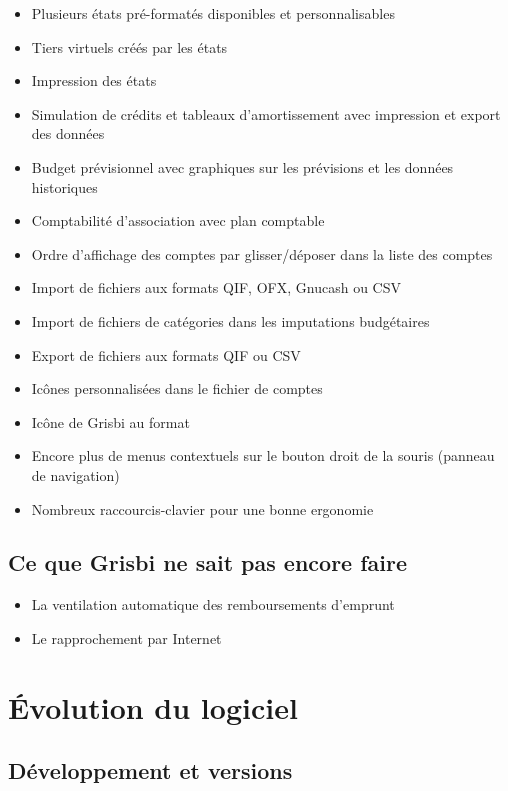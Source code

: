 \begin{itemize}
	\item Plusieurs états pré-formatés disponibles et personnalisables
	\item Tiers virtuels créés par les états
	\item Impression des états
	\item Simulation de crédits et tableaux d'amortissement avec impression et export des données
	\item Budget prévisionnel avec graphiques sur les prévisions et les données historiques
	\item Comptabilité d'association avec plan comptable
	\item Ordre d'affichage des comptes par glisser/déposer dans la liste des comptes
	\item Import de fichiers aux formats \gls{QIF}, \gls{OFX}, \gls{Gnucash} ou \gls{CSV}
	\item Import de fichiers de catégories dans les imputations budgétaires
	\item Export de fichiers aux formats \gls{QIF} ou \gls{CSV}
	\item Icônes personnalisées dans le fichier de comptes
	\item Icône de Grisbi au format 
	\item Encore plus de menus contextuels sur le bouton droit de la souris (panneau de navigation)
	\item Nombreux raccourcis-clavier pour une bonne ergonomie
\end{itemize}


\subsection{Ce que Grisbi ne sait pas encore faire}

\begin{itemize}
	\item La ventilation automatique des remboursements d'emprunt
	\item Le rapprochement par Internet
\end{itemize}


\section{Évolution du logiciel}


\subsection{Développement et versions\label{introduction-versions}}

